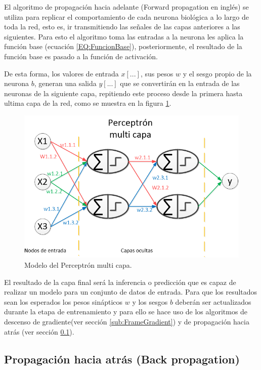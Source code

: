         El algoritmo de propagación hacia adelante (Forward propagation en inglés) se utiliza para replicar el comportamiento de cada neurona biológica a lo largo de toda la red, esto es, ir transmitiendo las señales de las capas anteriores a las siguientes. Para esto el algoritmo toma las entradas a la neurona les aplica la función base (ecuación \ref{EQ:FuncionBase}), posteriormente, el resultado de la función base es pasado a la función de activación. 
        
        De esta forma, los valores de entrada $x[...]$, sus pesos $w$ y el sesgo propio de la neurona $b$, generan una salida $y[...]$ que se convertirán en la entrada de las neuronas de la siguiente capa, repitiendo este proceso desde la primera hasta ultima capa de la red, como se muestra en la figura \ref{fig:PerceptronMulti2}.
        
        \begin{figure}[ht!]
        	\centering
        	\includegraphics[width=0.6\linewidth]{imgs/02-Referential/02-PerceptronMulticapa.png}
        	\caption[Modelo del Perceptrón multi capa]{Modelo del Perceptrón multi capa.}
    	    \label{fig:PerceptronMulti2}
        \end{figure}%
    
        El resultado de la capa final será la inferencia o predicción que es capaz de realizar un modelo para un conjunto de datos de entrada. Para que los resultados sean los esperados los pesos sinápticos $w$ y los sesgos $b$ deberán ser actualizados durante la etapa de entrenamiento y para ello se hace uso de los algoritmos de descenso de gradiente(ver sección \ref{sub:FrameGradient}) y de propagación hacia atrás (ver sección \ref{sub:FrameBackPropagation}).
        
    \subsection{Propagación hacia atrás (Back propagation)}
    \label{sub:FrameBackPropagation}
    
